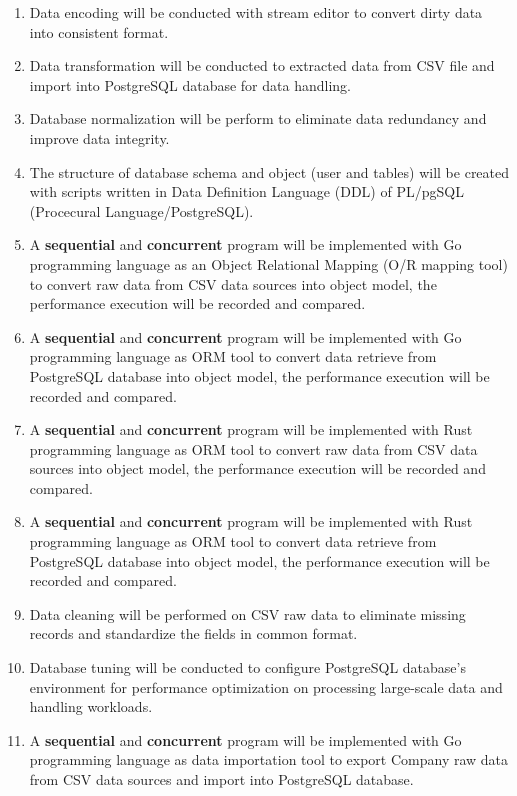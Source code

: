 \begin{enumerate}[topsep=0pt,itemsep=-1ex,partopsep=1ex,parsep=1.5ex]
	
	\item Data encoding will be conducted with stream editor to convert dirty data into consistent format.
	\item Data transformation will be conducted to extracted data from CSV file and import into PostgreSQL database for data handling.
	\item Database normalization will be perform to eliminate data redundancy and improve data integrity.
	\item The structure of database schema and object (user and tables) will be created with scripts written in Data Definition Language (DDL) of PL/pgSQL (Procecural Language/PostgreSQL). 
	\item A \textbf{sequential} and \textbf{concurrent} program will be implemented with Go programming language as an Object Relational Mapping (O/R mapping tool) to convert raw data from CSV data sources into object model, the performance execution will be recorded and compared. 
	\item A \textbf{sequential} and \textbf{concurrent} program will be implemented with Go programming language as ORM tool to convert data retrieve from PostgreSQL database into object model, the performance execution will be recorded and compared.  
	\item A \textbf{sequential} and \textbf{concurrent} program will be implemented with Rust programming language as ORM tool to convert raw data from CSV data sources into object model, the performance execution will be recorded and compared. 
	\item A \textbf{sequential} and \textbf{concurrent} program will be implemented with Rust programming language as ORM tool to convert data retrieve from PostgreSQL database into object model, the performance execution will be recorded and compared.
	\item Data cleaning will be performed on CSV raw data to eliminate missing records and standardize the fields in common format. 
	\item Database tuning will be conducted to configure PostgreSQL database's environment for performance optimization on processing large-scale data and handling workloads. 
	\item A \textbf{sequential} and \textbf{concurrent} program will be implemented with Go programming language as data importation tool to export Company raw data from CSV data sources and import into PostgreSQL database. 

\end{enumerate}
